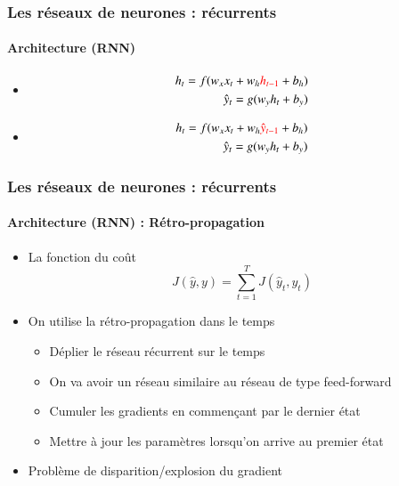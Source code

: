 \documentclass[xcolor=table]{beamer}
\begin{document}
\begin{frame}
\frametitle{Les réseaux de neurones : récurrents}
\framesubtitle{Architecture (RNN)}

\begin{minipage}{0.49\textwidth} 
	\begin{itemize}
		\item {}
		\begin{align*}
		h_t = f(w_x x_t + w_h \textcolor{red}{h_{t-1}} + b_h) \\
		\hat{y}_t = g(w_y h_t + b_y)
		\end{align*}
		\item {}
		\begin{align*}
		h_t = f(w_x x_t + w_h \textcolor{red}{\hat{y}_{t-1}} + b_h) \\
		\hat{y}_t = g(w_y h_t + b_y)
		\end{align*}
	\end{itemize}
\end{minipage}
%
\begin{minipage}{0.5\textwidth}
\end{minipage}

\end{frame}

\begin{frame}
\frametitle{Les réseaux de neurones : récurrents}
\framesubtitle{Architecture (RNN) : Rétro-propagation}

\begin{itemize}
	\item La fonction du coût 
	\[
	J(\hat{y}, y) = \sum_{t=1}^{T} J(\hat{y}_t, y_t)
	\]
	\item On utilise la rétro-propagation dans le temps \cite{1990-werbos}  
	\begin{itemize}
		\item Déplier le réseau récurrent sur le temps 
		\item On va avoir un réseau similaire au réseau de type feed-forward 
		\item Cumuler les gradients en commençant par le dernier état 
		\item Mettre à jour les paramètres lorsqu'on arrive au premier état
	\end{itemize}
	\item Problème de disparition/explosion du gradient
\end{itemize}


\end{frame}
\end{document}
